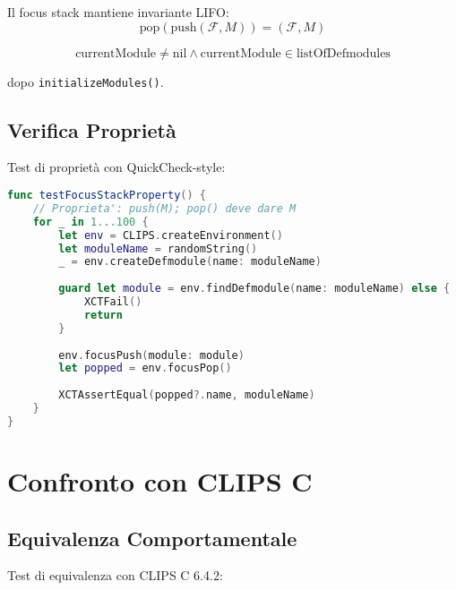 \begin{proposizione}
Il focus stack mantiene invariante LIFO:
\begin{equation}
\text{pop}(\text{push}(\mathcal{F}, M)) = (\mathcal{F}, M)
\end{equation}
\end{proposizione}

\begin{proposizione}
\begin{equation}
\text{currentModule} \neq \text{nil} \land \text{currentModule} \in \text{listOfDefmodules}
\end{equation}

dopo \texttt{initializeModules()}.
\end{proposizione}

\subsection{Verifica Proprietà}

Test di proprietà con QuickCheck-style:

\begin{lstlisting}[language=Swift]
func testFocusStackProperty() {
    // Proprieta': push(M); pop() deve dare M
    for _ in 1...100 {
        let env = CLIPS.createEnvironment()
        let moduleName = randomString()
        _ = env.createDefmodule(name: moduleName)
        
        guard let module = env.findDefmodule(name: moduleName) else {
            XCTFail()
            return
        }
        
        env.focusPush(module: module)
        let popped = env.focusPop()
        
        XCTAssertEqual(popped?.name, moduleName)
    }
}
\end{lstlisting}

\section{Confronto con CLIPS C}

\subsection{Equivalenza Comportamentale}

Test di equivalenza con CLIPS C 6.4.2:

